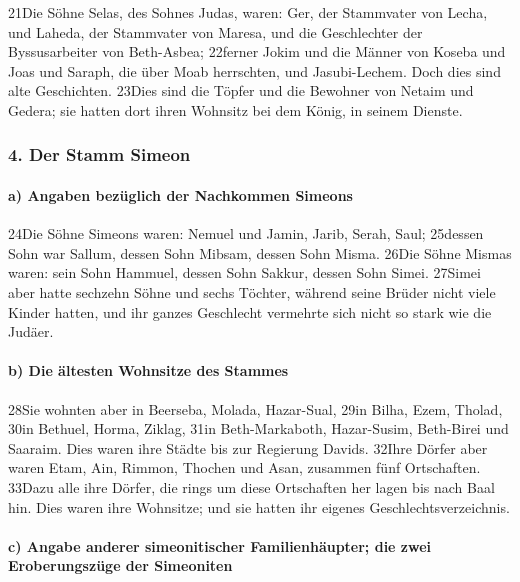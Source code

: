 21Die Söhne Selas, des Sohnes Judas, waren: Ger, der Stammvater von
Lecha, und Laheda, der Stammvater von Maresa, und die Geschlechter der
Byssusarbeiter von Beth-Asbea; 22ferner Jokim und die Männer von Koseba
und Joas und Saraph, die über Moab herrschten, und Jasubi-Lechem. Doch
dies sind alte Geschichten. 23Dies sind die Töpfer und die Bewohner von
Netaim und Gedera; sie hatten dort ihren Wohnsitz bei dem König, in
seinem Dienste.

\hypertarget{der-stamm-simeon}{%
\subsubsection{4. Der Stamm Simeon}\label{der-stamm-simeon}}

\hypertarget{a-angaben-bezuxfcglich-der-nachkommen-simeons}{%
\paragraph{a) Angaben bezüglich der Nachkommen
Simeons}\label{a-angaben-bezuxfcglich-der-nachkommen-simeons}}

24Die Söhne Simeons waren: Nemuel und Jamin, Jarib, Serah, Saul;
25dessen Sohn war Sallum, dessen Sohn Mibsam, dessen Sohn Misma. 26Die
Söhne Mismas waren: sein Sohn Hammuel, dessen Sohn Sakkur, dessen Sohn
Simei. 27Simei aber hatte sechzehn Söhne und sechs Töchter, während
seine Brüder nicht viele Kinder hatten, und ihr ganzes Geschlecht
vermehrte sich nicht so stark wie die Judäer.

\hypertarget{b-die-uxe4ltesten-wohnsitze-des-stammes}{%
\paragraph{b) Die ältesten Wohnsitze des
Stammes}\label{b-die-uxe4ltesten-wohnsitze-des-stammes}}

28Sie wohnten aber in Beerseba, Molada, Hazar-Sual, 29in Bilha, Ezem,
Tholad, 30in Bethuel, Horma, Ziklag, 31in Beth-Markaboth, Hazar-Susim,
Beth-Birei und Saaraim. Dies waren ihre Städte bis zur Regierung Davids.
32Ihre Dörfer aber waren Etam, Ain, Rimmon, Thochen und Asan, zusammen
fünf Ortschaften. 33Dazu alle ihre Dörfer, die rings um diese
Ortschaften her lagen bis nach Baal hin. Dies waren ihre Wohnsitze; und
sie hatten ihr eigenes Geschlechtsverzeichnis.

\hypertarget{c-angabe-anderer-simeonitischer-familienhuxe4upter-die-zwei-eroberungszuxfcge-der-simeoniten}{%
\paragraph{c) Angabe anderer simeonitischer Familienhäupter; die zwei
Eroberungszüge der
Simeoniten}\label{c-angabe-anderer-simeonitischer-familienhuxe4upter-die-zwei-eroberungszuxfcge-der-simeoniten}}

